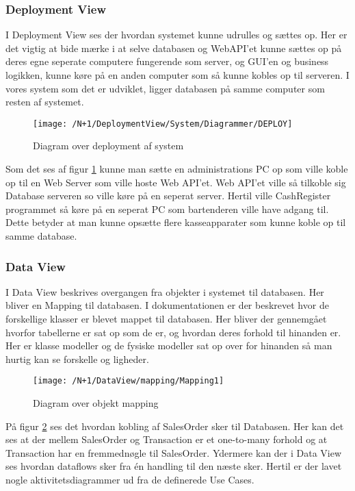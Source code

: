 \subsubsection{Deployment View}
I Deployment View ses der hvordan systemet kunne udrulles og sættes op. Her er det vigtig at bide mærke i at selve databasen og \gls{WebAPI}'et kunne sættes op på deres egne seperate computere fungerende som server, og GUI'en og business logikken, kunne køre på en anden computer som så kunne kobles op til serveren. I vores system som det er udviklet, ligger databasen på samme computer som resten af systemet. \newline\newline
\begin{figure}[H]
	\centering
	\texttt{[image: /N+1/DeploymentView/System/Diagrammer/DEPLOY]}
	\caption{Diagram over deployment af system}
	\label{fig:DeplayDia}
\end{figure}
Som det ses af figur \ref{fig:DeplayDia} kunne man sætte en administrations PC op som ville koble op til en Web Server som ville hoste Web API'et. Web API'et ville så tilkoble sig Database serveren so  ville køre på en seperat server. Hertil ville CashRegister programmet så køre på en seperat PC som bartenderen ville have adgang til. Dette betyder at man kunne opsætte flere kasseapparater som kunne koble op til samme database.  

\subsubsection{Data View}
I Data View beskrives overgangen fra objekter i systemet til databasen. Her bliver en Mapping til databasen.\newline\newline
I dokumentationen er der beskrevet hvor de forskellige klasser er blevet mappet til databasen. Her bliver der gennemgået hvorfor tabellerne er sat op som de er, og hvordan deres forhold til hinanden er. Her er klasse modeller og de fysiske modeller sat op over for hinanden så man hurtig kan se forskelle og ligheder.

\begin{figure}[H]
	\centering
	\texttt{[image: /N+1/DataView/mapping/Mapping1]}
	\caption{Diagram over objekt mapping}
	\label{MapDia}
\end{figure}	

På figur \ref{MapDia} ses det hvordan kobling af SalesOrder sker til Databasen. Her kan det ses at der mellem SalesOrder og Transaction er et one-to-many forhold og at Transaction har en fremmednøgle til SalesOrder.\newline\newline
Ydermere kan der i Data View ses hvordan dataflows sker fra én handling til den næste sker. Hertil er der lavet nogle aktivitetsdiagrammer ud fra de definerede Use Cases. 

